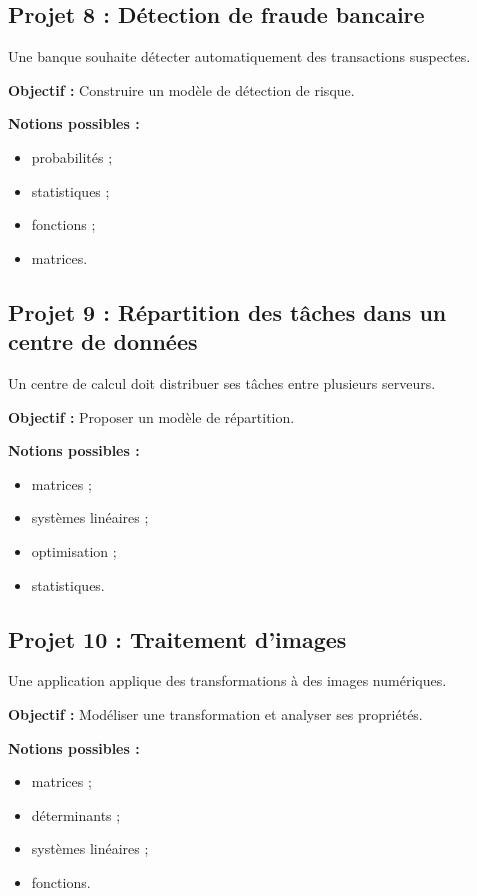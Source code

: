 \documentclass[12pt,a4paper]{article}
\begin{document}
\bigskip

\subsection*{Projet 8 : Détection de fraude bancaire}

Une banque souhaite détecter automatiquement des transactions suspectes.

\textbf{Objectif :}
Construire un modèle de détection de risque.

\textbf{Notions possibles :}

\begin{itemize}
\item probabilités ;
\item statistiques ;
\item fonctions ;
\item matrices.
\end{itemize}

\bigskip

\subsection*{Projet 9 : Répartition des tâches dans un centre de données}

Un centre de calcul doit distribuer ses tâches entre plusieurs serveurs.

\textbf{Objectif :}
Proposer un modèle de répartition.

\textbf{Notions possibles :}

\begin{itemize}
\item matrices ;
\item systèmes linéaires ;
\item optimisation ;
\item statistiques.
\end{itemize}

\bigskip

\subsection*{Projet 10 : Traitement d'images}

Une application applique des transformations à des images numériques.

\textbf{Objectif :}
Modéliser une transformation et analyser ses propriétés.

\textbf{Notions possibles :}

\begin{itemize}
\item matrices ;
\item déterminants ;
\item systèmes linéaires ;
\item fonctions.
\end{itemize}
\end{document}
